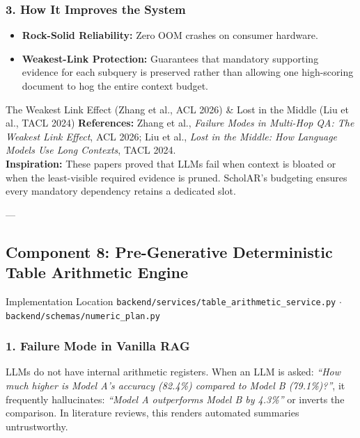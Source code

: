 \documentclass[11pt,a4paper]{article}
\begin{document}
\subsubsection{3. How It Improves the System}
\begin{itemize}[leftmargin=*]
    \item \textbf{Rock-Solid Reliability:} Zero OOM crashes on consumer hardware.
    \item \textbf{Weakest-Link Protection:} Guarantees that mandatory supporting evidence for each subquery is preserved rather than allowing one high-scoring document to hog the entire context budget.
\end{itemize}

\begin{inspirationbox}{The Weakest Link Effect (Zhang et al., ACL 2026) \& Lost in the Middle (Liu et al., TACL 2024)}
\textbf{References:} Zhang et al., \emph{Failure Modes in Multi-Hop QA: The Weakest Link Effect}, ACL 2026; Liu et al., \emph{Lost in the Middle: How Language Models Use Long Contexts}, TACL 2024.\\
\textbf{Inspiration:} These papers proved that LLMs fail when context is bloated or when the least-visible required evidence is pruned. ScholAR's budgeting ensures every mandatory dependency retains a dedicated slot.
\end{inspirationbox}

---

\subsection{Component 8: Pre-Generative Deterministic Table Arithmetic Engine}
\begin{codebox}{Implementation Location}
\texttt{backend/services/table\_arithmetic\_service.py} $\cdot$ \texttt{backend/schemas/numeric\_plan.py}
\end{codebox}

\subsubsection{1. Failure Mode in Vanilla RAG}
LLMs do not have internal arithmetic registers. When an LLM is asked: \emph{``How much higher is Model A's accuracy (82.4\%) compared to Model B (79.1\%)?''}, it frequently hallucinates: \emph{``Model A outperforms Model B by 4.3\%''} or inverts the comparison. In literature reviews, this renders automated summaries untrustworthy.
\end{document}
